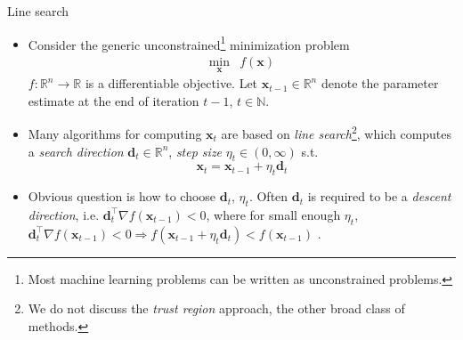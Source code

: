 \documentclass{beamer}
\numberwithin{equation}{section}
\begin{document}
\begin{frame}{Line search}
    \begin{itemize}
        \item
        Consider the generic unconstrained\footnote{
            Most machine learning problems can be written as unconstrained
            problems.
        } minimization problem
        \begin{equation} \label{eq:unconstrained_min}
            \begin{array}{ll}
                \displaystyle\min_\mathbf{x} & f(\mathbf{x})
            \end{array}
        \end{equation}
        $ f : \mathbb{R}^n \rightarrow \mathbb{R} $ is a differentiable
        objective. Let $ \mathbf{x}_{t - 1} \in \mathbb{R}^n $ denote the
        parameter estimate at the end of iteration $ t - 1 $,
        $ t \in \mathbb{N} $.

        \item
        Many algorithms for computing $ \mathbf{x}_t $ are based on
        \textit{line search}\footnote{
            We do not discuss the \textit{trust region} approach, the other
            broad class of methods.
        }, which computes a \textit{search direction}
        $ \mathbf{d}_t \in \mathbb{R}^n $, \textit{step size}
        $ \eta_t \in (0, \infty) $ s.t. \cite{nocedal_opt}
        \begin{equation} \label{eq:line_search_eq}
            \mathbf{x}_t = \mathbf{x}_{t - 1} + \eta_t\mathbf{d}_t
        \end{equation}

        \item
        Obvious question is how to choose $ \mathbf{d}_t $, $ \eta_t $. Often
        $ \mathbf{d}_t $ is required to be a \textit{descent direction}, i.e.
        $ \mathbf{d}_t^\top\nabla f(\mathbf{x}_{t - 1}) < 0 $, where for small
        enough $ \eta_t $, $ \mathbf{d}_t^\top\nabla f(\mathbf{x}_{t - 1}) < 0
        \Rightarrow f(\mathbf{x}_{t - 1} + \eta_t\mathbf{d}_t) <
        f(\mathbf{x}_{t - 1}) $ \cite{nocedal_opt}.
    \end{itemize}

    \medskip
\end{frame}
\end{document}
